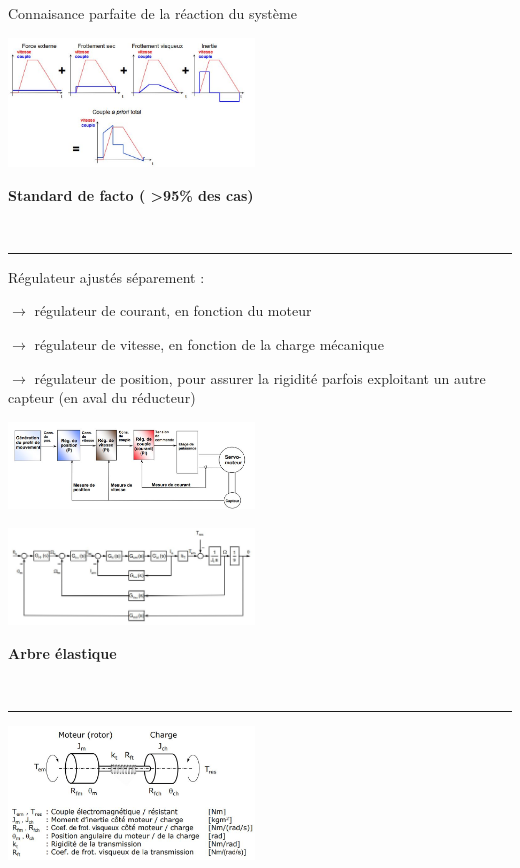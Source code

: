 \documentclass[	DIV=calc,%
							paper=a4,%
							fontsize=10pt,%
							twocolumn]{scrartcl} %
\newcounter{mycounter}
\newcommand{\formdesc}[1]{\large\textbf{#1} \addtocounter{mycounter}{1} \hfill \themycounter \\ \vspace{-3mm} \hrule \vspace{2mm}}
\begin{document}
Connaisance parfaite de la réaction du système 

\includegraphics[width=0.49\textwidth]{img/com_apriorie_2.JPG}


\formdesc{Standard de facto ( >95\% des cas)}

Régulateur ajustés séparement :

$\rightarrow $ régulateur de courant, en fonction du moteur

$\rightarrow $ régulateur de vitesse, en fonction de la charge mécanique

$\rightarrow $ régulateur de position, pour assurer la rigidité parfois exploitant un autre capteur (en aval du réducteur)

\includegraphics[width=0.49\textwidth]{img/stad_facto.JPG}


\includegraphics[width=0.49\textwidth]{img/stad_facto_2.JPG}

\formdesc{Arbre élastique }

\includegraphics[width=0.49\textwidth]{img/arbre_elastique.JPG}
\end{document}

